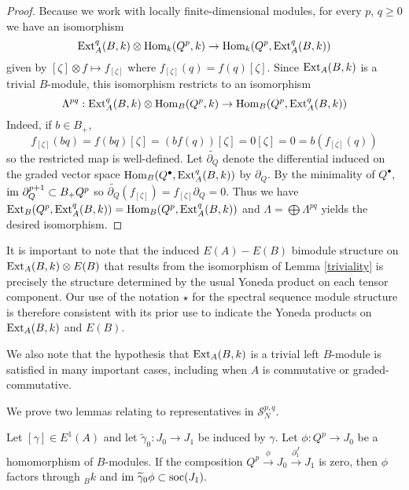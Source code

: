 \documentclass[11pt,righttag]{amsart}
\begin{document}
 \begin{proof} 
 Because we work with locally finite-dimensional modules, for every $p$, $q\ge 0$ we have an isomorphism
 $${\hbox{{\rm Ext}}}_A^q(B,k)\otimes {\hbox{Hom}}_k(Q^p,k)\rightarrow {\hbox{Hom}}_k(Q^p,{\hbox{{\rm Ext}}}_A^q(B,k))$$ given by $[{\zeta}]\otimes f\mapsto f_{[{\zeta}]}$ where $f_{[{\zeta}]}(q)=f(q)[{\zeta}]$. Since ${\hbox{{\rm Ext}}}_A(B,k)$ is a trivial $B$-module, this isomorphism restricts to an isomorphism
  $$\Lambda^{pq}:{\hbox{{\rm Ext}}}_A^q(B,k)\otimes {\hbox{Hom}}_B(Q^p,k)\rightarrow {\hbox{Hom}}_B(Q^p,{\hbox{{\rm Ext}}}_A^q(B,k))$$ 
 Indeed, if $b\in B_+$, $$f_{[{\zeta}]}(bq) = f(bq)[{\zeta}]=(bf(q))[{\zeta}]=0[{\zeta}]=0=b(f_{[{\zeta}]}(q))$$ so the restricted map is well-defined. Let $\widetilde{\partial_Q}$ denote the differential induced on the graded vector space ${\hbox{Hom}}_B(Q^{\bullet},{\hbox{{\rm Ext}}}_A^q(B,k))$ by $\partial_Q$. By the minimality of $Q^{\bullet}$, ${\hbox{im}}\ \partial_Q^{p+1}\subset B_+Q^p$ so $\widetilde{\partial_Q}(f_{[{\zeta}]})=f_{[{\zeta}]}\partial_Q=0$. Thus we have  ${\hbox{{\rm Ext}}}_B(Q^p,{\hbox{{\rm Ext}}}_A^q(B,k))={\hbox{Hom}}_B(Q^p,{\hbox{{\rm Ext}}}_A^q(B,k))$  and $\Lambda=\bigoplus \Lambda^{pq}$ yields the desired isomorphism.
 
 \end{proof}
 
 
 \begin{rmk}
 \label{remark}
 It is important to note that the induced $E(A)-E(B)$ bimodule structure on ${\hbox{{\rm Ext}}}_A(B,k)\otimes E(B)$ that results from the isomorphism of Lemma \ref{triviality} is precisely the structure determined by the usual Yoneda product on each tensor component. Our use of the notation $\star$ for the spectral sequence module structure is therefore consistent with its prior use to indicate the Yoneda products on ${\hbox{{\rm Ext}}}_A(B,k)$ and $E(B)$. 
 \end{rmk}

We also note that the hypothesis that ${\hbox{{\rm Ext}}}_A(B,k)$ is a trivial left $B$-module is satisfied in many important cases, including when $A$ is commutative or graded-commutative. 
 
 

 
 We prove two lemmas relating to representatives in ${\mathcal S}_N^{p,q}$. 
 
 
 \begin{lemma}
 \label{lifting}
Let $[\gamma]\in E^1(A)$ and let  $\widetilde{\gamma}_0:J_0\rightarrow J_1$ be induced by $\gamma$. 
 Let $\phi:Q^p\rightarrow J_0$ be a homomorphism of $B$-modules. If the composition $Q^p\xrightarrow{\phi} J_0\xrightarrow{\partial^J_1} J_1$ is zero, then $\phi$ factors through $_Bk$ and ${\hbox{im}}\ \widetilde{\gamma}_0\phi\subset {\text{soc}}(J_1).$ 
 
 
 
 \end{lemma}
 
\end{document}
